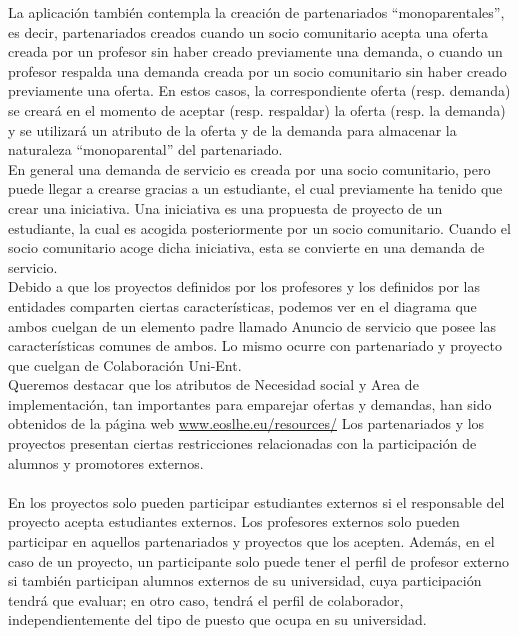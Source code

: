 \documentclass[11pt]{book}
\begin{document}
La aplicación también contempla la
creación de partenariados ``monoparentales'', es decir, partenariados
creados cuando un socio comunitario acepta una oferta creada por un
profesor sin haber creado previamente una demanda, o cuando un profesor
respalda una demanda creada por un socio comunitario sin haber creado
previamente una oferta. En estos casos, la correspondiente oferta (resp.
demanda) se creará en el momento de aceptar (resp. respaldar) la oferta
(resp. la demanda) y se utilizará un atributo de la oferta y de la
demanda para almacenar la naturaleza ``monoparental'' del partenariado.\\
En general una demanda de servicio es creada por una socio comunitario, pero puede llegar a crearse gracias a un estudiante, el cual previamente ha tenido que crear una iniciativa. Una iniciativa es una propuesta de proyecto de un estudiante, la cual es acogida posteriormente por un socio comunitario. Cuando el socio comunitario acoge dicha iniciativa, esta se convierte en una demanda de servicio.\\
Debido a que los proyectos definidos por los profesores y los definidos por las entidades comparten ciertas características, podemos ver en el diagrama que ambos cuelgan de un elemento padre llamado Anuncio de servicio que posee las características comunes de ambos.
Lo mismo ocurre con partenariado y proyecto que cuelgan de Colaboración Uni-Ent.\\
Queremos destacar que los atributos de Necesidad social y Area de implementación, tan importantes para emparejar ofertas y demandas, han sido obtenidos de la página web \url{www.eoslhe.eu/resources/}
Los partenariados y los proyectos presentan ciertas restricciones relacionadas con la participación de alumnos y promotores externos.\\\\
En los proyectos solo pueden participar estudiantes externos si el responsable del proyecto acepta estudiantes externos. 
Los profesores externos solo pueden participar en aquellos partenariados y proyectos que los acepten. Además, en el caso de un proyecto, un participante solo puede tener el
perfil de profesor externo si también participan alumnos externos de su
universidad, cuya participación tendrá que evaluar; en otro caso, tendrá
el perfil de colaborador, independientemente del tipo de puesto que
ocupa en su universidad.\\\\
\end{document}
